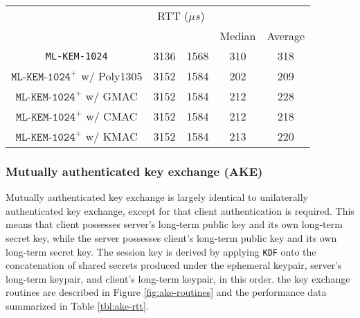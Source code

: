 \documentclass[journal=tches,submission]{iacrtrans}
\newcommand{\us}{\mu s}
\begin{document}
\begin{table}[h]
\begin{tabular}{|c|c|c|c|c|}
        & \multicolumn{2}{|c|}{RTT ($\us$)} \\
        \cline{4-5}
        & & & Median & Average \\
        \hline
        \texttt{ML-KEM-1024} & 3136 & 1568 & 310 & 318 \\
        \hline
        $\texttt{ML-KEM-1024}^+$ w/ Poly1305 & 3152 & 1584 & 202 & 209 \\
        \hline
        $\texttt{ML-KEM-1024}^+$ w/ GMAC & 3152 & 1584 & 212 & 228 \\
        \hline
        $\texttt{ML-KEM-1024}^+$ w/ CMAC & 3152 & 1584 & 212 & 218 \\
        \hline
        $\texttt{ML-KEM-1024}^+$ w/ KMAC & 3152 & 1584 & 213 & 220 \\
        \hline
    \end{tabular}
\end{table}

\subsubsection{Mutually authenticated key exchange (AKE)}\label{sec:akex}
Mutually authenticated key exchange is largely identical to unilaterally authenticated key exchange, except for that client authentication is required. This means that client possesses server's long-term public key and its own long-term secret key, while the server possesses client's long-term public key and its own long-term secret key. The session key is derived by applying \texttt{KDF} onto the concatenation of shared secrets produced under the ephemeral keypair, server's long-term keypair, and client's long-term keypair, in this order. the key exchange routines are described in Figure \ref{fig:ake-routines} and the performance data summarized in Table \ref{tbl:ake-rtt}.
\end{document}
